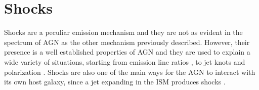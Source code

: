 \documentclass[../main.tex]{subfiles}
\begin{document}
\section{Shocks}
\label{sec:shocks}

Shocks are a peculiar emission mechanism and they are not as evident in the spectrum of AGN as the other mechanism previously described.
However, their presence is a well established properties of AGN \citep[e.g.][]{Dopita95}
and they are used to explain a wide variety of situations, starting from emission line ratios \citep[e.g.][]{Dopita95b,Dopita00,Contini02,Congiu17}, to jet knots and polarization \citep[e.g.][]{Lister05, Beckmann12}.
Shocks are also one of the main ways for the AGN to interact with its own host galaxy, since a jet expanding in the ISM produces shocks \citep{Dopita00,Fragile17}.
\end{document}
